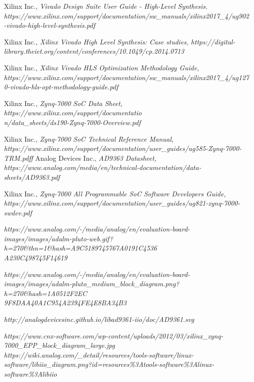 \documentclass[en,printmode]{mgr}
\begin{document}
\begin{thebibliography}{9}
Xilinx Inc.,
\textit{Vivado Design Suite User Guide - High-Level Synthesis. https://www.xilinx.com/support/documentation/sw_manuals/xilinx2017_4/ug902-vivado-high-level-synthesis.pdf}

Xilinx Inc.,
\textit{Xilinx Vivado High Level Synthesis: Case studies, https://digital-library.theiet.org/content/conferences/10.1049/cp.2014.0713}

Xilinx Inc.,
\textit{Xilinx Vivado HLS Optimization Methodology Guide, https://www.xilinx.com/support/documentation/sw_manuals/xilinx2017_4/ug1270-vivado-hls-opt-methodology-guide.pdf}

Xilinx Inc.,
\textit{Zynq-7000 SoC Data Sheet, https://www.xilinx.com/support/documentatio \\
n/data_sheets/ds190-Zynq-7000-Overview.pdf}

Xilinx Inc.,
\textit{Zynq-7000 SoC Technical Reference Manual, https://www.xilinx.com/support/documentation/user_guides/ug585-Zynq-7000-TRM.pdff}
Analog Devices Inc.,
\textit{AD9363 Datasheet, https://www.analog.com/media/en/technical-documentation/data-sheets/AD9363.pdf}

Xilinx Inc.,
\textit{Zynq-7000 All
Programmable SoC
Software Developers Guide, https://www.xilinx.com/support/documentation/user_guides/ug821-zynq-7000-swdev.pdf}

\textit{https://www.analog.com/-/media/analog/en/evaluation-board-images/images/adalm-pluto-web.gif?h=270\&thn=1\&hash=A9C5189745767A0191C4536 \\
A230C498745F14619}

\textit{https://www.analog.com/-/media/analog/en/evaluation-board-images/images/adalm-pluto_medium_block_diagram.png?h=270\&hash=1A0512F2EC \\
9F8DAA40A1C954A2394FE4E8BA34B3}

\textit{http://analogdevicesinc.github.io/libad9361-iio/doc/AD9361.svg}

\textit{https://www.cnx-software.com/wp-content/uploads/2012/03/xilinx_zynq-7000_EPP_block_diagram_large.jpg}
\textit{https://wiki.analog.com/_detail/resources/tools-software/linux-software/libiio_diagram.png?id=resources\%3Atools-software\%3Alinux-software\%3Alibiio}
\end{thebibliography}
\end{document}
